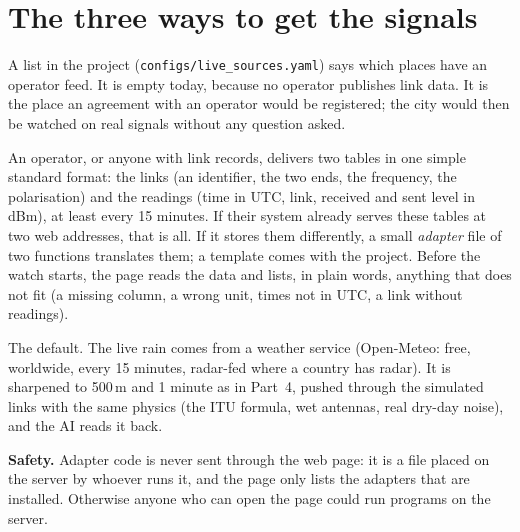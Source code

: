 \section{The three ways to get the signals}
\label{sec:p7_modes}
\begin{description}[leftmargin=0pt,itemsep=0.3em]
\item[A known live source.] A list in the project (\texttt{configs/live\_sources.yaml}) says which places have an
operator feed. It is empty today, because no operator publishes link data. It is the place an agreement with an
operator would be registered; the city would then be watched on real signals without any question asked.
\item[My own data.] An operator, or anyone with link records, delivers two tables in one simple standard format: the
links (an identifier, the two ends, the frequency, the polarisation) and the readings (time in UTC, link, received and
sent level in dBm), at least every 15 minutes. If their system already serves these tables at two web addresses, that
is all. If it stores them differently, a small \emph{adapter} file of two functions translates them; a template comes
with the project. Before the watch starts, the page reads the data and lists, in plain words, anything that does not
fit (a missing column, a wrong unit, times not in UTC, a link without readings).
\item[Simulation.] The default. The live rain comes from a weather service (Open-Meteo: free, worldwide, every 15
minutes, radar-fed where a country has radar). It is sharpened to 500\,m and 1 minute as in Part~4, pushed through the
simulated links with the same physics (the ITU formula, wet antennas, real dry-day noise), and the AI reads it back.
\end{description}

\begin{careful}
\textbf{Safety.} Adapter code is never sent through the web page: it is a file placed on the server by whoever runs it,
and the page only lists the adapters that are installed. Otherwise anyone who can open the page could run programs on
the server.
\end{careful}

